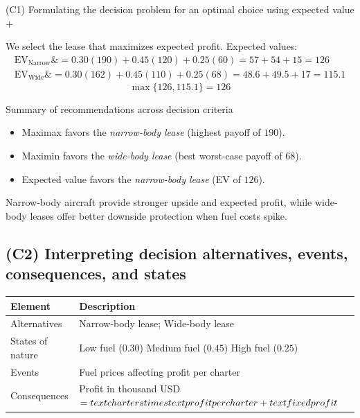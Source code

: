 \documentclass[11pt]{article}
\begin{document}
	
	
	(C1) Formulating the decision problem for an optimal choice using expected value
	+
	
	
	We select the lease that maximizes expected profit. Expected values:
	\[
	\begin{aligned}
		\mathrm{EV}_{\text{Narrow}} \&= 0.30(190) + 0.45(120) + 0.25(60) = 57 + 54 + 15 = 126 \\
		\mathrm{EV}_{\text{Wide}} \&= 0.30(162) + 0.45(110) + 0.25(68) = 48.6 + 49.5 + 17 = 115.1
	\end{aligned}
	\]
	\[
	\max\{126, 115.1\} = 126
	\]
	
	Summary of recommendations across decision criteria
	\begin{itemize}
		\item Maximax favors the \emph{narrow-body lease} (highest payoff of $190$).
		\item Maximin favors the \emph{wide-body lease} (best worst-case payoff of $68$).
		\item Expected value favors the \emph{narrow-body lease} (EV of $126$).
	\end{itemize}
	
	
	Narrow-body aircraft provide stronger upside and expected profit, while wide-body leases offer better downside
	protection when fuel costs spike.
	
	\subsection*{(C2) Interpreting decision alternatives, events, consequences, and states}
	
	\hypertarget{problem10-c2}{}
	
	\begin{center}
		\begin{tabular}{ll}
			\toprule
			Element & Description \\
			\midrule
			Alternatives & Narrow-body lease; Wide-body lease \\
			States of nature & Low fuel
			($0.30$)
			Medium fuel
			($0.45$)
			High fuel
			($0.25$) \\
			Events & Fuel prices affecting profit per charter \\
			Consequences & Profit in thousand USD $= \\text{charters} \\times \\text{profit per charter} + \\text{fixed profit}$ \\
			\bottomrule
		\end{tabular}
	\end{center}
	
\end{document}
